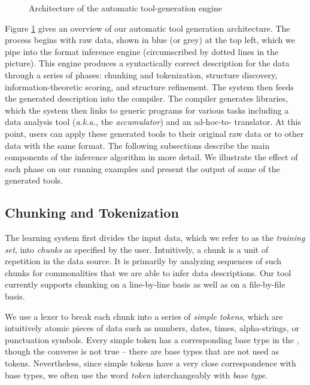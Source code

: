 
\begin{figure}
\begin{center}
\caption{Architecture of the automatic tool-generation engine} \shrink
\label{fig-archi}
\end{center}
\end{figure}

Figure \ref{fig-archi} gives an overview of our automatic
tool generation architecture. The process 
begins with raw data, shown in blue (or grey) at the top left, which we pipe
into the format inference engine
(circumscribed by dotted lines in the picture).  
This engine produces a syntactically correct \pads{}
description for the data
through a series of phases:
chunking and tokenization, structure discovery, information-theoretic
scoring, and structure refinement.
The system then feeds the generated \pads{} description into the
\pads{} compiler.  The compiler generates libraries, which the system
then links to generic programs for various tasks including a data
analysis tool ({\em a.k.a.,} the {\em accumulator}) and an
ad-hoc-to-\xml{} translator.  At this point, users can apply these
generated tools to their original raw data or to other data with the
same format.
The following subsections describe the main components of the
inference algorithm in more detail.  We 
illustrate the effect of each phase on our running examples and
present the output of some of the generated tools.

\subsection{Chunking and Tokenization}
The learning system first divides the input data, which we refer
to as the {\em training set}, into {\em chunks} as specified by the
user. Intuitively, a chunk is a unit of repetition in the data source.
It is primarily by analyzing sequences of such chunks for commonalities
that we are able to infer data descriptions.  Our tool currently supports
chunking on a line-by-line basis as well as on a file-by-file basis.  

We use a lexer to break each chunk into a series of {\em simple
tokens}, which are intuitively atomic pieces of data such as
numbers, dates, times, alpha-strings, or punctuation symbols.
Every simple token has a corresponding
base type in the \ir{}, though the converse is not true -- there are 
base types that are not used as tokens.  Nevertheless, since
simple tokens have a very close correspondence with base types,
we often use the word {\em token} interchangeably with {\em base type}.
  
